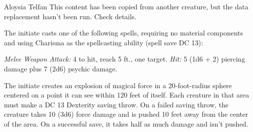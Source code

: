 \documentclass[10pt,a4paper,twoside,bg=print,twocolumn,openany,nodeprecatedcode]{dndbook}
\begin{document}
\begin{DndMonster}[float=t]{Aloysia Telfan}
\DndMonsterBasics[
armor-class = {12},
hit-points = {\DndDice{12d8 + 12}},
speed = {30 ft.}
]
\DndMonsterAbilityScores[
 str = 10,
 dex = 14,
 con = 12,
 int = 14,
 wis = 10,
 cha = 16
]
\DndMonsterDetails[
skills = {Arcana +6, Deception +5, History +4, Perception +2},
languages = {Common plus one other language},
challenge = 2,
]
This content has been copied from another creature, but the data replacement hasn't been run. Check details.

The initiate casts one of the following spells, requiring no material components and using Charisma as the spellcasting ability (spell save DC 13):
\begin{DndMonsterSpells}
\end{DndMonsterSpells}
\textsl{Melee Weapon Attack:} 4 to hit, reach 5 ft., one target. \textsl{Hit:} 5 (1d6 + 2) piercing damage plus 7 (2d6) psychic damage.

The initiate creates an explosion of magical force in a 20-foot-radius sphere centered on a point it can see within 120 feet of itself. Each creature in that area must make a DC 13 Dexterity saving throw. On a failed saving throw, the creature takes 10 (3d6) force damage and is pushed 10 feet away from the center of the area. On a successful save, it takes half as much damage and isn't pushed.

\end{DndMonster}
\end{document}
